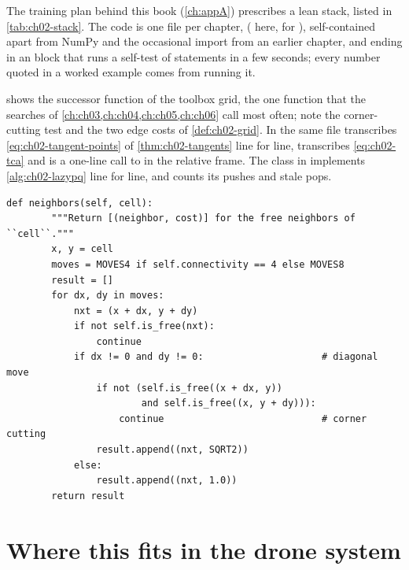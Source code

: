 The training plan behind this book (\cref{ch:appA}) prescribes a lean stack, listed in \cref{tab:ch02-stack}. The code is one file per chapter,  ( here,  for \astar), self-contained apart from NumPy and the occasional import from an earlier chapter, and ending in an  block that runs a self-test of  statements in a few seconds; every number quoted in a worked example comes from running it.

 shows the successor function of the toolbox grid, the one function that the searches of \cref{ch:ch03,ch:ch04,ch:ch05,ch:ch06} call most often; note the corner-cutting test and the two edge costs of \cref{def:ch02-grid}. In the same file  transcribes \cref{eq:ch02-tangent-points} of \cref{thm:ch02-tangents} line for line,  transcribes \cref{eq:ch02-tca} and  is a one-line call to  in the relative frame. The class  in  implements \cref{alg:ch02-lazypq} line for line, and counts its pushes and stale pops.

\begin{lstlisting}[caption={The successor function of the grid (from \code{code/ch02\_toolbox.py}).},label={lst:ch02-grid-neighbors}]
    def neighbors(self, cell):
        """Return [(neighbor, cost)] for the free neighbors of ``cell``."""
        x, y = cell
        moves = MOVES4 if self.connectivity == 4 else MOVES8
        result = []
        for dx, dy in moves:
            nxt = (x + dx, y + dy)
            if not self.is_free(nxt):
                continue
            if dx != 0 and dy != 0:                     # diagonal move
                if not (self.is_free((x + dx, y))
                        and self.is_free((x, y + dy))):
                    continue                            # corner cutting
                result.append((nxt, SQRT2))
            else:
                result.append((nxt, 1.0))
        return result
\end{lstlisting}

\section{Where this fits in the drone system}
\label{sec:ch02-drone}

